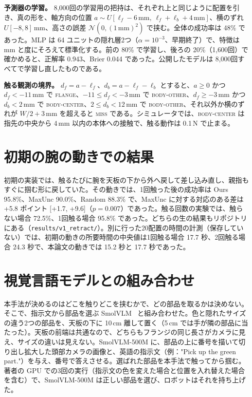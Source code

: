 \documentclass[conference]{IEEEtran}
\newcommand{\Ours}{Ours}
\newcommand{\Unc}{MaxUnc}
\newcommand{\Rand}{Random}
\begin{document}
\textbf{予測器の学習。} 8,000回の学習用の把持は、それぞれ上と同じように配置を引き、真の形を、軸方向の位置 $a\sim U[\ell_f-6\,\text{mm},\ \ell_f+\ell_b+4\,\text{mm}]$、横のずれ $U[-8,8]$\,mm、高さの誤差 $\mathcal{N}(0,(1\,\text{mm})^2)$ で挟む。全体の成功率は 48\% であった。MLP は 64 ユニットの隠れ層2つ（$\alpha=10^{-3}$、早期終了）で、特徴は mm と度にそろえて標準化する。前の 80\% で学習し、後ろの 20\%（1,600回）で確かめると、正解率 0.943、Brier 0.044 であった。公開したモデルは 8,000回すべてで学習し直したものである。

\textbf{触る観測の境界。} $d_f=a-\ell_f$、$d_b=a-\ell_f-\ell_b$ とすると、$a\ge0$ かつ $d_f<-11$\,mm で \textsc{flange}、$-11\le d_f<-3$\,mm で \textsc{body-other}、$d_f\ge-3$\,mm かつ $d_b<2$\,mm で \textsc{body-center}、$2\le d_b<12$\,mm で \textsc{body-other}、それ以外か横のずれが $W/2+3$\,mm を超えると \textsc{miss} である。シミュレータでは、\textsc{body-center} は指先の中央から 4\,mm 以内の本体への接触で、触る動作は 0.1\,N で止まる。

\section{初期の腕の動きでの結果}\label{app:v1}
初期の実装では、触るたびに腕を天板の下から外へ戻して差し込み直し、親指もすぐに掴む形に戻していた。その動きでは、1回触った後の成功率は \Ours{} 95.8\%、\Unc{} 90.0\%、\Rand{} 88.3\% で、\Unc{} に対する対応のある差は +5.8 ポイント [+1.7, +9.6]（$p=0.007$）であった。触る回数の実験では、触らない場合 72.5\%、1回触る場合 95.8\% であった。どちらの生の結果もリポジトリにある（\texttt{results/v1\_retract/}）。別に行った20配置の時間の計測（保存していない）では、初期の動きの所要時間の中央値は1回触る場合 17.7 秒、2回触る場合 24.3 秒で、本論文の動きでは 15.2 秒と 17.7 秒であった。

\section{視覚言語モデルとの組み合わせ}\label{app:vlm}
本手法が決めるのはどこを触りどこを挟むかで、どの部品を取るかは決めない。そこで、指示文から部品を選ぶ SmolVLM~\cite{marafioti2025smolvlm} と組み合わせた。色と隠れたサイズの違う2つの部品を、天板の下に 10\,cm 離して置く（5\,cm では手が隣の部品に当たった）。天板の前端は共通なので、どちらもフランジの同じ長さがカメラに見え、サイズの違いは見えない。SmolVLM-500M に、部品の上に番号を描いて切り出し拡大した頭部カメラの画像と、英語の指示文（例："Pick up the green part."）を与え、番号で答えさせる。選ばれた部品を本手法で触ってから掴む。著者の GPU での3回の実行（指示文の色を変えた場合と位置を入れ替えた場合を含む）で、SmolVLM-500M は正しい部品を選び、ロボットはそれを持ち上げた。
\end{document}
